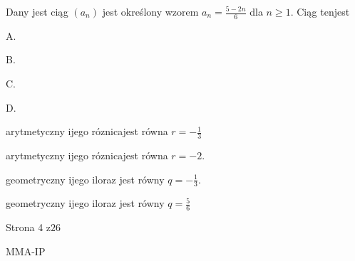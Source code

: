 \documentclass[a4paper,12pt]{article}
\begin{document}
Dany jest ciąg $(a_{n})$ jest określony wzorem $a_{n}=\displaystyle \frac{5-2n}{6}$ dla $n\geq 1$. Ciąg tenjest

A.

B.

C.

D.

arytmetyczny ijego róznicajest równa $r=-\displaystyle \frac{1}{3}$

arytmetyczny ijego róznicajest równa $r=-2.$

geometryczny ijego iloraz jest równy $q=-\displaystyle \frac{1}{3}.$

geometryczny ijego iloraz jest równy $q=\displaystyle \frac{5}{6}$

Strona 4 $\mathrm{z}26$

MMA-IP
\end{document}
